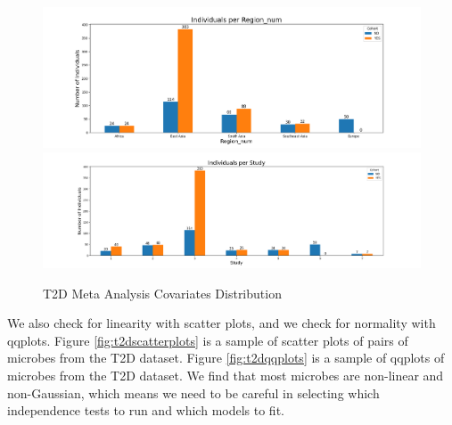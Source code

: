 \documentclass[12pt,letterpaper]{article}
\begin{document}
\begin{figure}[h!]
   \centering
   \includegraphics[width=\linewidth]{../plots/sam-t2d/region_num_bar_chart.png}
   \medskip
   \includegraphics[width=\linewidth]{../plots/sam-t2d/study_bar_chart.png}
\caption{T2D Meta Analysis Covariates Distribution}
\label{fig:sam-t2dcovariates}
\end{figure}

We also check for linearity with scatter plots, and we check for normality with qqplots. Figure \ref{fig:t2dscatterplots} is a sample of scatter plots of pairs of microbes from the T2D dataset. Figure \ref{fig:t2dqqplots} is a sample of qqplots of microbes from the T2D dataset. We find that most microbes are non-linear and non-Gaussian, which means we need to be careful in selecting which independence tests to run and which models to fit. 
\end{document}
